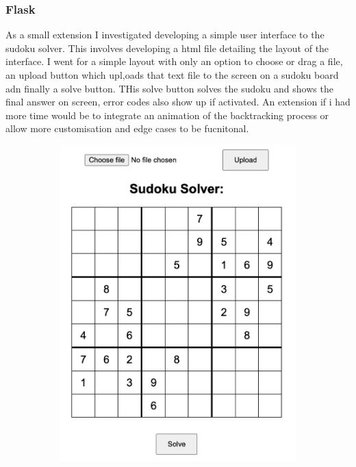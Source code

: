 \documentclass{report}
\begin{document}
\subsubsection*{Flask}
As a small extension I investigated developing a simple user interface to the sudoku solver.
This involves developing a html file detailing the layout of the interface.
I went for a simple layout with only an option to choose or drag a file, an upload button which upl,oads that text file to the screen on a sudoku board adn finally a solve button.
THis solve button solves the sudoku and shows the final answer on screen, error codes also show up if activated.
An extension if i had more time would be to integrate an animation of the backtracking process or allow more customisation and edge cases to be fucnitonal.

\begin{figure}[htbp]
    \centering
    \begin{subfigure}[b]{0.45\textwidth}
        \centering
        \includegraphics[width=\textwidth]{Images/app.png}

\end{subfigure}
\end{figure}
\end{document}
